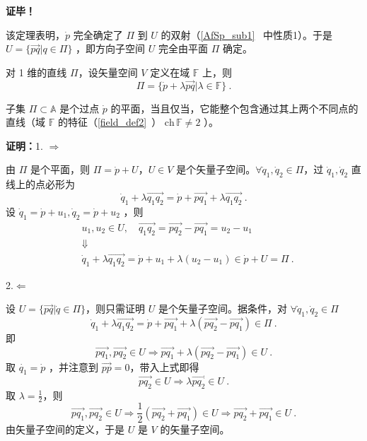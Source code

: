 \textbf{证毕！}

该定理表明，$\dot p$ 完全确定了 $\Pi$ 到 $U$ 的双射（\autoref{AfSp_sub1}~ 中性质1）。于是 $U=\{\overrightarrow{pq}|q\in \Pi\}$ ，即方向子空间 $U$ 完全由平面 $\Pi$ 确定。

对 1 维的直线 $\Pi$，设矢量空间 $V$ 定义在域 $\mathbb F$ 上，则
\begin{equation}\label{SAfSp_eq4}
\Pi=\{\dot p+\lambda\overrightarrow{pq}|\lambda\in \mathbb F\}~.
\end{equation}
\begin{theorem}{}
子集 $\Pi \subset\mathbb A$ 是个过点 $\dot p$ 的平面，当且仅当，它能整个包含通过其上两个不同点的直线（域 $\mathbb F$ 的特征（\autoref{field_def2}~） $\mathrm{ch}\,\mathbb F\neq 2$ ）。
\end{theorem}
\textbf{证明：}1.
$\Rightarrow$

由 $\Pi$ 是个平面，则 $\Pi=\dot p+U$，$U\in V$ 是个矢量子空间。$\forall\dot q_1,\dot q_2\in \Pi$，过 $\dot q_1,\dot q_2$ 直线上的点必形为
\begin{equation}
\dot q_1+\lambda\overrightarrow{q_1q_2}=\dot p+\overrightarrow{pq_1}+\lambda\overrightarrow{q_1q_2}~.
\end{equation}
设 $\dot q_1=\dot p+u_1,\dot q_2=\dot p+u_2$ ，则
\begin{equation}
\begin{aligned}
&u_1,u_2\in U,\quad \overrightarrow{q_1q_2}=\overrightarrow{pq_2}-\overrightarrow{pq_1}=u_2-u_1\\
&\Downarrow\\
&\dot q_1+\lambda\overrightarrow{q_1q_2}=\dot p+u_1+\lambda(u_2-u_1)\in\dot p+U=\Pi~.
\end{aligned}
\end{equation}

2.$\Leftarrow$

设 $U=\{\overrightarrow{pq}|\dot q\in \Pi\}$，则只需证明 $U$ 是个矢量子空间。据条件，对 $\forall \dot q_1,\dot q_2\in\Pi$
\begin{equation}
\dot q_1+\lambda\overrightarrow{q_1q_2}=\dot p+\overrightarrow{pq_1}+\lambda(\overrightarrow{pq_2}-\overrightarrow{pq_1})\in\Pi~.
\end{equation}
 即
 \begin{equation}
 \overrightarrow{pq_1},\overrightarrow{pq_2}\in U\Rightarrow \overrightarrow{pq_1}+\lambda(\overrightarrow{pq_2}-\overrightarrow{pq_1})\in U~.
 \end{equation}
 取 $\dot{q_1}=\dot{p}$ ，并注意到 $\overrightarrow{pp}=0$，带入上式即得 
 \begin{equation}\label{SAfSp_eq2}
 \overrightarrow{pq_2}\in U\Rightarrow\lambda\overrightarrow{pq_2}\in U ~.
 \end{equation}
取 $\lambda=\frac{1}{2}$，则 
\begin{equation}
\overrightarrow{pq_1},\overrightarrow{pq_2}\in U\Rightarrow \frac{1}{2}(\overrightarrow{pq_2}+\overrightarrow{pq_1})\in U\Rightarrow \overrightarrow{pq_2}+\overrightarrow{pq_1}\in U~.
\end{equation}
由矢量子空间的定义，于是 $U$ 是 $V$ 的矢量子空间。

